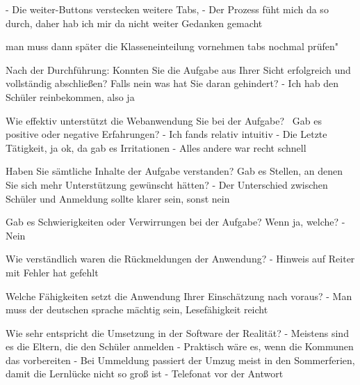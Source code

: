 - Die weiter-Buttons verstecken weitere Tabs,
- Der Prozess füht mich da so durch, daher hab ich mir da nicht weiter Gedanken gemacht

man muss dann später die Klasseneinteilung vornehmen
tabs nochmal prüfen"
									
									
Nach der Durchführung:									
Konnten Sie die Aufgabe aus Ihrer Sicht erfolgreich und vollständig abschließen? Falls nein was hat Sie daran gehindert?		
- Ich hab den Schüler reinbekommen, also ja							

















Wie effektiv unterstützt die Webanwendung Sie bei der Aufgabe?  Gab es positive oder negative Erfahrungen?		
- Ich fands relativ intuitiv
- Die Letzte Tätigkeit, ja ok, da gab es Irritationen
- Alles andere war recht schnell













Haben Sie sämtliche Inhalte der Aufgabe verstanden? Gab es Stellen, an denen Sie sich mehr Unterstützung gewünscht hätten?		
- Der Unterschied zwischen Schüler und Anmeldung sollte klarer sein, sonst nein
							
Gab es Schwierigkeiten oder Verwirrungen bei der Aufgabe? Wenn ja, welche?		
- Nein







Wie verständlich waren die Rückmeldungen der Anwendung?		
- Hinweis auf Reiter mit Fehler hat gefehlt










Welche Fähigkeiten setzt die Anwendung Ihrer Einschätzung nach voraus?		
- Man muss der deutschen sprache mächtig sein, Lesefähigkeit reicht							

Wie sehr entspricht die Umsetzung in der Software der Realität? 		
- Meistens sind es die Eltern, die den Schüler anmelden
- Praktisch wäre es, wenn die Kommunen das vorbereiten
- Bei Ummeldung passiert der Umzug meist in den Sommerferien, damit die Lernlücke nicht so groß ist
- Telefonat vor der Antwort









